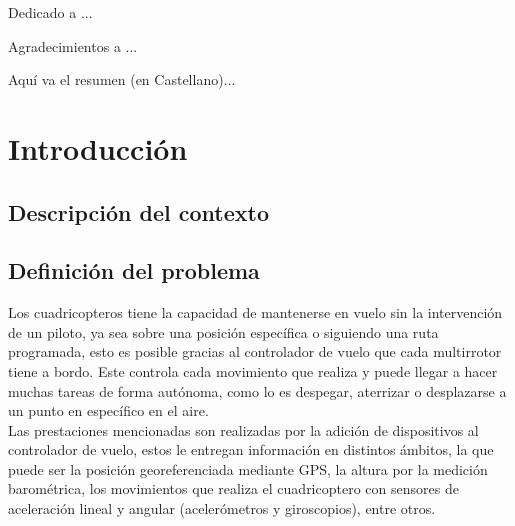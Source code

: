 \documentclass{iccmemoria}
\author{Jorge Gómez Valderrama}
\date{mes, año}
\begin{document}
\maketitle

\begin{dedicatory}
Dedicado a ...
\end{dedicatory}

\begin{acknowledgment}
Agradecimientos a ...
\end{acknowledgment}

\tableofcontents
\listoffigures
\listoftables

\begin{resumen}
Aquí va el resumen (en Castellano)... 
\end{resumen}


\chapter{Introducción}

\section{Descripción del contexto}

\section{Definición del problema}

Los cuadricopteros tiene la capacidad de mantenerse en vuelo sin la intervención de un piloto, ya sea sobre una posición específica o siguiendo una ruta programada, esto es posible gracias al controlador de vuelo que cada multirrotor tiene a bordo. Este controla cada movimiento que realiza y puede llegar a hacer muchas tareas de forma autónoma, como lo es despegar, aterrizar o desplazarse a un punto en específico en el aire.\\
 
Las prestaciones mencionadas son realizadas por la adición de dispositivos al controlador de vuelo, estos le entregan información en distintos ámbitos, la que puede ser la posición georeferenciada mediante GPS, la altura por la medición barométrica, los movimientos que realiza el cuadricoptero con sensores de aceleración lineal y angular (acelerómetros y giroscopios), entre otros.\\
 
\end{document}
